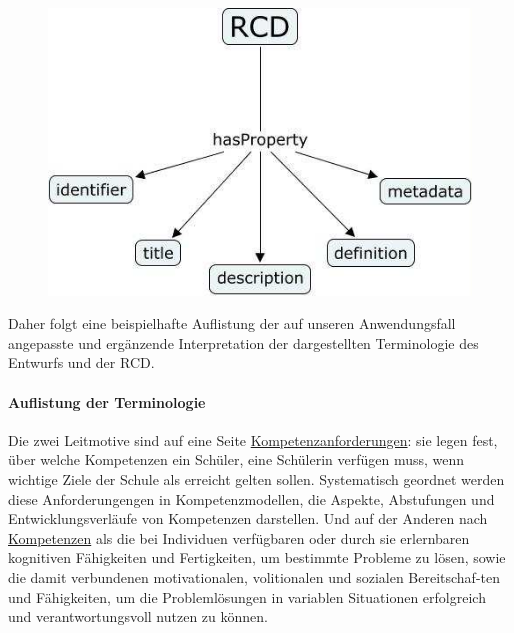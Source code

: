 \documentclass[
12pt,
english,
ngerman,
headsepline,
twoside,
openright,
numbers=noenddot,version=first
]{scrreprt}
\begin{document}
\begin{figure}
	\includegraphics[width=0.9\linewidth]{pics/RCD.jpg}
\end{figure}


Daher folgt eine beispielhafte Auflistung der auf unseren Anwendungsfall angepasste und ergänzende Interpretation der dargestellten Terminologie des Entwurfs und der RCD.



\paragraph{Auflistung der Terminologie} Die zwei Leitmotive sind auf eine Seite \underline{Kompetenzanforderungen}: sie legen fest, über welche Kompetenzen ein Schüler, eine Schülerin verfügen muss, wenn wichtige Ziele der Schule als erreicht gelten sollen. Systematisch geordnet werden diese Anforderungengen in Kompetenzmodellen, die Aspekte, Abstufungen und Entwicklungsverläufe von Kompetenzen darstellen\cite{Competence}. Und auf der Anderen nach \underline{Kompetenzen} als die bei Individuen verfügbaren oder durch sie erlernbaren kognitiven Fähigkeiten und Fertigkeiten, um bestimmte Probleme zu lösen, sowie die damit verbundenen motivationalen, volitionalen und sozialen Bereitschaf-ten und Fähigkeiten, um die Problemlösungen in variablen Situationen erfolgreich und verantwortungsvoll nutzen zu können\cite{weinert2002leistungsmessungen}.
\end{document}
